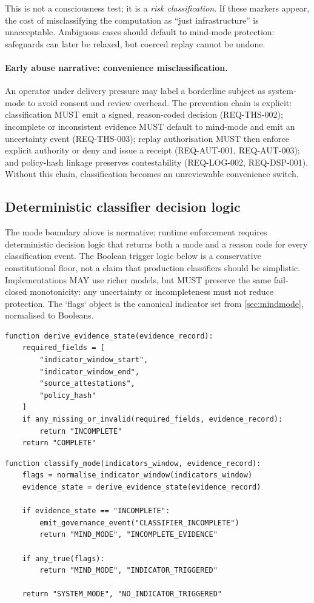 \documentclass[11pt]{article}
\theoremstyle{definition}
\theoremstyle{plain}
\theoremstyle{remark}
\begin{document}
This is not a consciousness test; it is a \emph{risk classification}.
If these markers appear, the cost of misclassifying the computation as ``just infrastructure'' is unacceptable.
Ambiguous cases should default to mind-mode protection: safeguards can later be relaxed, but coerced replay cannot be undone.

\paragraph{Early abuse narrative: convenience misclassification.}
An operator under delivery pressure may label a borderline subject as system-mode to avoid consent and review overhead.
The prevention chain is explicit:
classification MUST emit a signed, reason-coded decision (REQ-THS-002);
incomplete or inconsistent evidence MUST default to mind-mode and emit an uncertainty event (REQ-THS-003);
replay authorisation MUST then enforce explicit authority or deny and issue a receipt (REQ-AUT-001, REQ-AUT-003);
and policy-hash linkage preserves contestability (REQ-LOG-002, REQ-DSP-001).
Without this chain, classification becomes an unreviewable convenience switch.

\subsection{Deterministic classifier decision logic}
\label{sec:classifier-logic}
The mode boundary above is normative; runtime enforcement requires deterministic decision logic that
returns both a mode and a reason code for every classification event.
The Boolean trigger logic below is a conservative constitutional floor, not a claim that production
classifiers should be simplistic.
Implementations MAY use richer models, but MUST preserve the same fail-closed monotonicity:
any uncertainty or incompleteness must not reduce protection.
The `flags` object is the canonical indicator set from \cref{sec:mindmode}, normalised to Booleans.

\begin{verbatim}
function derive_evidence_state(evidence_record):
    required_fields = [
        "indicator_window_start",
        "indicator_window_end",
        "source_attestations",
        "policy_hash"
    ]
    if any_missing_or_invalid(required_fields, evidence_record):
        return "INCOMPLETE"
    return "COMPLETE"
\end{verbatim}

\begin{verbatim}
function classify_mode(indicators_window, evidence_record):
    flags = normalise_indicator_window(indicators_window)
    evidence_state = derive_evidence_state(evidence_record)

    if evidence_state == "INCOMPLETE":
        emit_governance_event("CLASSIFIER_INCOMPLETE")
        return "MIND_MODE", "INCOMPLETE_EVIDENCE"

    if any_true(flags):
        return "MIND_MODE", "INDICATOR_TRIGGERED"

    return "SYSTEM_MODE", "NO_INDICATOR_TRIGGERED"
\end{verbatim}
\end{document}
